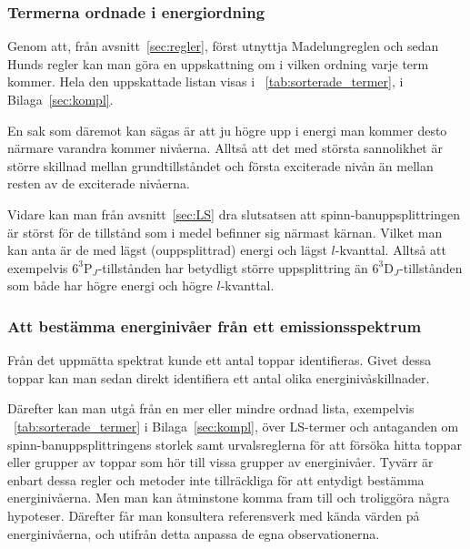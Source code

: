 \documentclass[11pt,a4paper]{article}
\newcommand{\tabref}{\tablename~\ref} %
\begin{document}
\subsubsection{Termerna ordnade i energiordning}
Genom att, från avsnitt~\ref{sec:regler}, först utnyttja
Madelungreglen och sedan Hunds regler kan man göra en uppskattning om
i vilken ordning varje term kommer. Hela den uppskattade listan visas
i \tabref{tab:sorterade_termer}, i Bilaga~\ref{sec:kompl}.

En sak som däremot kan sägas är att ju högre upp i energi man kommer
desto närmare varandra kommer nivåerna. Alltså att det med största
sannolikhet är större skillnad mellan grundtillståndet och första
exciterade nivån än mellan resten av de exciterade nivåerna. 

Vidare kan man från avsnitt~\ref{sec:LS} dra slutsatsen att
spinn-banuppsplittringen är störst för de tillstånd som i medel
befinner sig närmast kärnan. Vilket man kan anta är de med lägst
(ouppsplittrad) energi och lägst $l$-kvanttal.\footnotemark{} Alltså
att exempelvis $6^3\mathrm{P}_J$-tillstånden har betydligt större
uppsplittring än $6^3\mathrm{D}_J$-tillstånden som både har högre
energi och högre $l$-kvanttal.  


\subsubsection{Att bestämma energinivåer från ett emissionsspektrum}
\label{sec:teori_nivaer}
Från det uppmätta spektrat kunde ett antal toppar identifieras. Givet
dessa toppar kan man sedan direkt identifiera ett antal olika
energinivåskillnader. 

Därefter kan man utgå från en mer eller mindre ordnad lista,
exempelvis \tabref{tab:sorterade_termer} i Bilaga~\ref{sec:kompl},
över LS-termer och antaganden om spinn-banuppsplittringens storlek
samt urvalsreglerna för att försöka hitta toppar eller grupper av
toppar som hör till vissa grupper av energinivåer. 
Tyvärr är enbart dessa regler och metoder inte tillräckliga för att
entydigt bestämma energinivåerna. Men man kan åtminstone komma fram
till och troliggöra några hypoteser. Därefter får man konsultera
referensverk med kända värden på energinivåerna, och utifrån detta
anpassa de egna observationerna.
\end{document}
